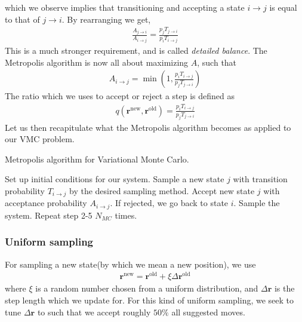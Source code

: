 \documentclass[11pt]{article}
\begin{document}
which we observe implies that transitioning and accepting a state $i\rightarrow j$ is equal to that of $j \rightarrow i$. By rearranging we get,
\begin{align}
	\frac{A_{j\rightarrow i}}{A_{i\rightarrow j}} = \frac{p_j T_{j\rightarrow i}}{p_i T_{i\rightarrow j}}
	\label{eq:detailed-balance}
\end{align}
This is a much stronger requirement, and is called \textit{detailed balance}. The Metropolis algorithm is now all about maximizing $A$, such that 
\begin{align*}
	A_{i\rightarrow j} = \min \left( 1 , \frac{p_i T_{i\rightarrow j}}{p_j T_{j\rightarrow i}} \right)
\end{align*}
The ratio which we uses to accept or reject a step is defined as
\begin{align}
	q(\mathbf{r}^\text{new},\mathbf{r}^\text{old}) = \frac{p_i T_{i\rightarrow j}}{p_j T_{j\rightarrow i}}
	\label{eq:acceptance-ratio}
\end{align}
Let us then recapitulate what the Metropolis algorithm becomes as applied to our VMC problem.
\begin{algorithm}[H]
	\caption{Metropolis algorithm for Variational Monte Carlo. }
	\label{alg:vmc-metropolis-algorithm}
	\begin{algorithmic}[1]
		\State Set up initial conditions for our system.
		\State Sample a new state $j$ with transition probability $T_{i\rightarrow j}$ by the desired sampling method.
		\State Accept new state $j$ with acceptance probability $A_{i\rightarrow j}$.
		\State If rejected, we go back to state $i$.
		\State Sample the system.
		\State Repeat step 2-5 $N_{MC}$ times.
	\end{algorithmic}
\end{algorithm}

\subsubsection{Uniform sampling}
For sampling a new state(by which we mean a new position), we use
\begin{align}
	\mathbf{r}^\text{new} = \mathbf{r}^\text{old} + \xi \Delta \mathbf{r}^\text{old}
	\label{eq:uniform-sampling}
\end{align}
where $\xi$ is a random number chosen from a uniform distribution, and $\Delta \mathbf{r}$ is the step length which we update for. For this kind of uniform sampling, we seek to tune $\Delta \mathbf{r}$ to such that we accept roughly $50\%$ all suggested moves. 
\end{document}
